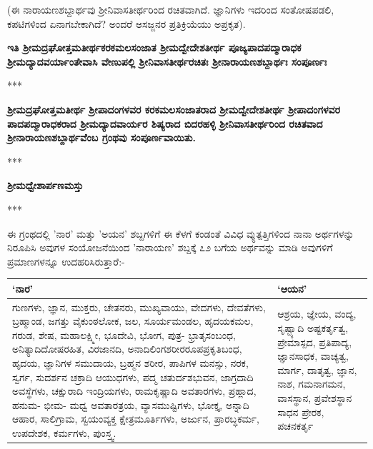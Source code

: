 (ಈ ನಾರಾಯಣಶಬ್ದಾರ್ಥವು ಶ‍್ರೀನಿವಾಸತೀರ್ಥರಿಂದ ರಚಿತವಾಗಿದೆ. ಜ್ಞಾನಿಗಳು ಇದರಿಂದ ಸಂತೋಷಪಡಲಿ, ಕಪಟಿಗಳಿಂದ ಏನಾಗಬೇಕಾಗಿದೆ? ಅಂದರೆ ಅಸಜ್ಜನರ ಪ್ರತಿಕ್ರಿಯೆಯು ಅಪ್ರಕೃತ).

\begin{center}
\textbf{ಇತಿ ಶ‍್ರೀಮದ್ರಘೋತ್ತಮತೀರ್ಥಕರಕಮಲಸಂಜಾತ ಶ‍್ರೀಮದ್ವೇದೇಶತೀರ್ಥ ಪೂಜ್ಯಪಾದಪದ್ಮಾರಾಧಕ ಶ‍್ರೀಮದ್ಯಾದವರ್ಯಾಂತೇವಾಸಿ ವೇಣುಪಲ್ಲಿ ಶ‍್ರೀನಿವಾಸತೀರ್ಥರಚಿತಃ ಶ‍್ರೀನಾರಾಯಣಶಬ್ದಾರ್ಥಃ ಸಂಪೂರ್ಣಃ}
\end{center}

\begin{center}
***
\end{center}

\begin{center}
\textbf{ಶ‍್ರೀಮದ್ರಘೋತ್ತಮತೀರ್ಥ ಶ‍್ರೀಪಾದಂಗಳವರ ಕರಕಮಲಸಂಜಾತರಾದ ಶ‍್ರೀಮದ್ವೇದೇಶತೀರ್ಥ ಶ‍್ರೀಪಾದಂಗಳವರ ಪಾದಪದ್ಮಾರಾಧಕರಾದ ಶ‍್ರೀಮದ್ಯಾದವಾರ್ಯರ ಶಿಷ್ಯರಾದ ಬಿದರಹಳ್ಳಿ ಶ‍್ರೀನಿವಾಸತೀರ್ಥರಿಂದ ರಚಿತವಾದ ಶ‍್ರೀನಾರಾಯಣಶಬ್ದಾರ್ಥವೆಂಬ ಗ್ರಂಥವು ಸಂಪೂರ್ಣವಾಯಿತು.}
\end{center}

\begin{center}
***
\end{center}

\begin{center}
\textbf{ಶ‍್ರೀಮಧ್ವೇಶಾರ್ಪಣಮಸ್ತು}
\end{center}

\begin{center}
***
\end{center}

ಈ ಗ್ರಂಥದಲ್ಲಿ 'ನಾರ' ಮತ್ತು 'ಅಯನ' ಶಬ್ದಗಳಿಗೆ ಈ ಕೆಳಗೆ ಕಂಡಂತೆ ವಿವಿಧ ವ್ಯುತ್ಪತ್ತಿಗಳಿಂದ ನಾನಾ ಅರ್ಥಗಳನ್ನು ನಿರೂಪಿಸಿ ಅವುಗಳ ಸಂಯೋಜನೆಯಿಂದ 'ನಾರಾಯಣ' ಶಬ್ದಕ್ಕೆ ೭೨ ಬಗೆಯ ಅರ್ಥವನ್ನು ಮಾಡಿ ಅವುಗಳಿಗೆ ಪ್ರಮಾಣಗಳನ್ನೂ ಉದಹರಿಸಿರುತ್ತಾರೆ:-

\medskip

\begin{tabular}{|p{5.5cm}|p{3.7cm}|}
\hline
\textbf{`ನಾರ'} & \textbf{`ಆಯನ'} \\
\hline
ಗುಣಗಳು, ಜ್ಞಾನ, ಮುಕ್ತರು, ಚೇತನರು, ಮುಖ್ಯವಾಯು, ವೇದಗಳು, ದೇವತೆಗಳು, ಬ್ರಹ್ಮಾಂಡ, ಜಗತ್ತು ವೈಕುಂಠಲೋಕ, ಜಲ, ಸೂರ್ಯಮಂಡಲ, ಹೃದಯಕಮಲ, ಗರುಡ, ಶೇಷ, ಮಹಾಲಕ್ಷ್ಮೀ, ಭೂದೇವಿ, ಭೋಗ, ಪುತ್ರ- ಭ್ರಾತೃಸಂಬಂಧ, ಅನಿತ್ಯಾದಿದೋಷರಹಿತ, ವಿರಜಾನದಿ, ಅನಾದಿಲಿಂಗಶರೀರರೂಪಪ್ರಕೃತಿಬಂಧ, ಹೃದಯ, ಜ್ಞಾನಿಗಳ ಸಮುದಾಯ,  ಬ್ರಹ್ಮನ ಶರೀರ, ಪಾಪಿಗಳ ಮನಸ್ಸು, ನರಕ, ಸ್ವರ್ಗ, ಸುದರ್ಶನ ಚಕ್ರಾದಿ ಆಯುಧಗಳು, ಪದ್ಮ ಚತುರ್ದಶಭುವನ, ಜಾಗ್ರದಾದಿ ಅವಸ್ಥೆಗಳು, ಚಕ್ಷುರಾದಿ ಇಂದ್ರಿಯಗಳು, ರಾಮಕೃಷ್ಣಾದಿ ಅವತಾರಗಳು, ಪ್ರಹ್ಲಾದ, ಹನುಮ- ಭೀಮ- ಮಧ್ವ ಅವತಾರತ್ರಯ, ವ್ಯಾಸಮುಷ್ಟಿಗಳು, ಭೋಕ್ತೃ, ಅನ್ನಾದಿ ಆಹಾರ, ಸಾಲಿಗ್ರಾಮ, ಸ್ವಯಂವ್ಯಕ್ತ ಕ್ಷೇತ್ರಮೂರ್ತಿಗಳು, ಅರ್ಜುನ, ಪ್ರಾರಬ್ಧಕರ್ಮ, ಉಪದೇಶಕ, ಕರ್ಮಗಳು, ಪುಂಸ್ತ್ವ. & ಆಶ್ರಯ, ಜ್ಞೇಯ,  ವಂದ್ಯ, ಸೃಷ್ಟ್ಯಾದಿ ಅಷ್ಟಕರ್ತೃತ್ವ, ಪ್ರೇಮಾಸ್ಪದ,  ಪ್ರತಿಪಾದ್ಯ, ಜ್ಞಾನಸಾಧಕ,  ವಾಚ್ಯತ್ವ, ಮಾರ್ಗ, ದಾತೃತ್ವ, ಜ್ಞಾನ, ನಾಶ,  ಗಮನಾಗಮನ,  ವಾಸಸ್ಥಾನ, ಪ್ರವೇಶಸ್ಥಾನ  ಸಾಧನ ಪ್ರೇರಕ, ಪಚನಕರ್ತೃ \\
\hline
\end{tabular}


